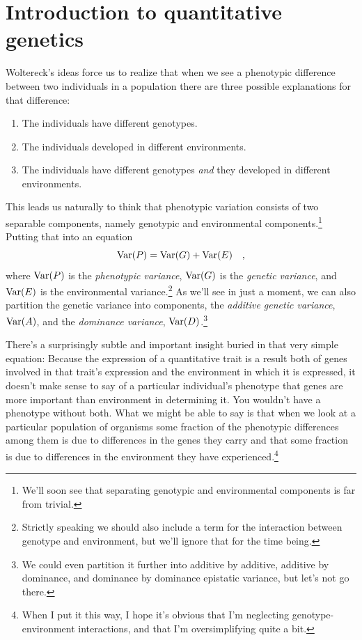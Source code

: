 \chapter{Introduction to quantitative genetics}

Woltereck's ideas force us to realize that when we see a phenotypic
difference between two individuals in a population there are three
possible explanations for that difference:

\begin{enumerate}

\item The individuals have different genotypes.

\item The individuals developed in different environments. 

\item The individuals have different genotypes {\it and\/} they
developed in different environments.

\end{enumerate}

\noindent This leads us naturally to think that phenotypic variation
consists of two separable components, namely genotypic and
environmental components.\footnote{We'll soon see that separating
genotypic and environmental components is far from trivial.} Putting
that into an equation
\[
\mbox{Var}(P) = \mbox{Var}(G) + \mbox{Var}(E) \quad , 
\]
where $\mbox{Var}(P)$ is the {\it phenotypic variance}, $\mbox{Var}(G)$ is the
{\it genetic variance}, and $\mbox{Var}(E)$ is the environmental
variance.\footnote{Strictly speaking we should also include a term for
the interaction between genotype and environment, but we'll ignore
that for the time being.} As we'll see in just a moment, we can also
partition the genetic variance into components, the {\it additive
genetic variance\/}, $\mbox{Var}(A)$, and the {\it dominance variance},
$\mbox{Var}(D)$.\footnote{We could even partition it further into additive
  by additive, additive by dominance, and dominance by dominance
  epistatic variance, but let's not go there.}  

There's a surprisingly subtle and important insight buried in that
very simple equation: Because the expression of a quantitative trait
is a result both of genes involved in that trait's expression and the
environment in which it is expressed, it doesn't make sense to say of
a particular individual's phenotype that genes are more important than
environment in determining it. You wouldn't have a phenotype without
both. What we might be able to say is that when we look at a
particular population of organisms some fraction of the phenotypic
differences among them is due to differences in the genes they carry
and that some fraction is due to differences in the environment they
have experienced.\footnote{When I put it this way, I hope it's obvious
  that I'm neglecting genotype-environment interactions, and that I'm
  oversimplifying quite a bit.} 

